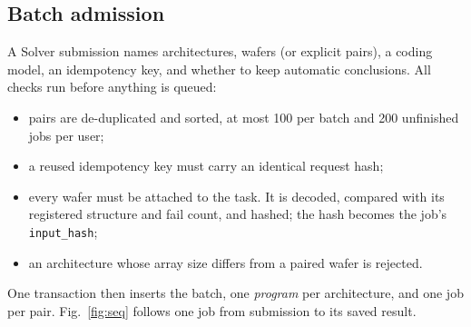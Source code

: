 \documentclass[conference]{IEEEtran}
\newcommand{\code}[1]{\texttt{\small #1}}
\begin{document}
\subsection{Batch admission}
A Solver submission names architectures, wafers (or explicit pairs), a coding
model, an idempotency key, and whether to keep automatic conclusions. All
checks run before anything is queued:
\begin{itemize}
\item pairs are de-duplicated and sorted, at most 100 per batch and 200
unfinished jobs per user;
\item a reused idempotency key must carry an identical request hash;
\item every wafer must be attached to the task. It is decoded, compared with
its registered structure and fail count, and hashed; the hash becomes the
job's \code{input\_hash};
\item an architecture whose array size differs from a paired wafer is
rejected.
\end{itemize}
One transaction then inserts the batch, one \emph{program} per architecture,
and one job per pair. Fig.~\ref{fig:seq} follows one job from submission to
its saved result.
\end{document}

